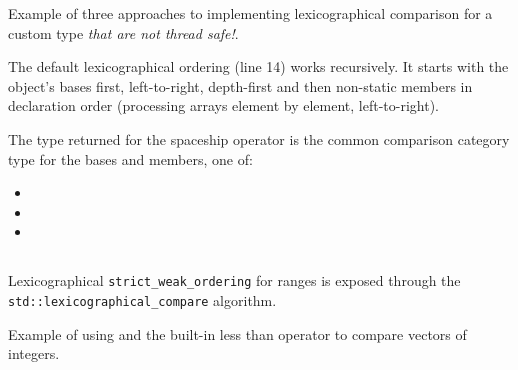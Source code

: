 \begin{codebox}[breakable]{\href{https://compiler-explorer.com/z/7PjY8fc1G}{\ExternalLink}}
\footnotesize Example of three approaches to implementing lexicographical comparison for a custom type \emph{that are not thread safe!}.
\tcblower
{}
\end{codebox}

The default lexicographical ordering (line 14) works recursively. It starts with the object’s bases first, left-to-right, depth-first and then non-static members in declaration order (processing arrays element by element, left-to-right).

The type returned for the spaceship operator is the common comparison category type for the bases and members, one of:
\begin{itemize}
    \item {}
    \item {}
    \item {}
\end{itemize}

\subsection{\texorpdfstring{}{\texttt{std::lexicographical\_compare}}}

Lexicographical \texttt{strict\_weak\_ordering} for ranges is exposed through the \newline\texttt{std::lexicographical\_compare} algorithm.



\begin{codebox}[breakable]{\href{https://compiler-explorer.com/z/YGW4ET1oa}{\ExternalLink}}
\footnotesize Example of using  and the built-in less than operator to compare vectors of integers.
\tcblower
{}
\end{codebox}

